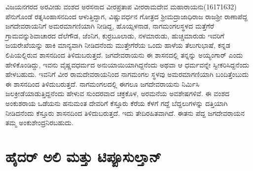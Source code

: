 ವಿಜಯನಗರದ ಅರವೀಡು ವಂಶದ ಅರಸನಾದ ವೀರಪ್ರತಾಪ ವೀರರಾಮದೇವ ಮಹಾರಾಯನು(1617\enginline{-}1632) ಪೆನುಗೊಂಡೆ ರತ್ನಸಿಂಹಾಸನದಿಂದ ಆಳುತ್ತಿದ್ದಾಗ, ವಿಷ್ಣುವರ್ಧನ ಗೋತ್ರದ ಶ‍್ರೀಮದ್ರಾಜಾಧಿರಾಜ ರಾಜಶ‍್ರೀ ರಾಣಾಪೆದ್ದ ಜಗದೇವರಾಯನಿಗೆ ಅಮರಮಾಗಣಿಯಾಗಿ ನೀಡಿದ್ದ, ಹೊಯ್ಸಳನಾಡ, ನಾಗಮಂಗಲಸ್ಥಳದ ಮತ್ತೆಗೆರೆ ಗ್ರಾಮವನ್ನು\break ಶಿವಾಚಾರದ ದೆಲೆಗೌಡ, ಜೆಂನಿಗ, ಕುರ್ರಬೂಲಾಡು, ನಳಮಾರುಡು, ಹುಚ್ಚಮಾರುಡು ಇವರಿಗೆ ಜಯರೇಖೆಯನ್ನು ಹಾಕಿ ಮಾನ್ಯವಾಗಿ ನೀಡಿದನೆಂದು ಮುತ್ತೇಗೆರೆಯ ಒಂದು ಹಾಳೆಯ ತೆಲುಗುಭಾಷೆ, ಕನ್ನಡ ಲಿಪಿಯಲ್ಲಿರುವ ಶಾಸನದಿಂದ ತಿಳಿದುಬರುತ್ತದೆ. ಜಗದೇವರಾಯನು ಈ ಶಾಸನದಲ್ಲಿ ತನ್ನನ್ನು ಅಯ್ಯಂಗಾರ್​ ಎಂದು ಹೇಳಿಕೊಂಡಿದ್ದು, ಇವನು ವೈಷ್ಣವಧರ್ಮದ ಅನುಯಾಯಿ\-ಯಾಗಿದ್ದನೆಂದು ಅಥವಾ ಆ ಧರ್ಮವನ್ನೇ ಸ್ವೀಕರಿಸಿದ್ದನೆಂದು ಹೇಳಬಹುದು. ಇವನಿಗೆ ವೀರ ರಾಮದೇವರಾಯನಿಂದ ನಾಗಮಂಗಲ ಸ್ಥಳವು ಅಮರಮಾಗಣಿಯಾಗಿ ಬಂದಿತ್ತೆಂಬುದು ಈ ಶಾಸನದಿಂದ ತಿಳಿದುಬರುತ್ತದೆ. ನಾಗಮಂಗಲದಲ್ಲಿ ಈಗಲೂ ಜಗದೇವರಾಯನು ನಿರ್ಮಿಸಿ ಜಲಕ್ರೀಡೆಯಾಡುತ್ತಿದ್ದನೆಂದು ಹೇಳುವ ಸುಂದರವಾದ ಚಕ್ರಕೊಳ, ಅರಮನೆಯ ಅವಶೇಷಗಳಿವೆ. ಈ ವಂಶದ ಅಂಕುಶರಾಯ ಒಡೆಯನು ಹನುಮಂತ ದೇವರಿಗೆ ಕೆಸ್ತೂರು ಕೆರೆಯ ಕೆಳಗೆ ಗದ್ದೆ ಬೆದ್ದಲುಗಳನ್ನು ದತ್ತಿಯಾಗಿ ನೀಡಿದನೆಂದು ಕೆಸ್ತೂರು ಶಾಸನದಿಂದ ತಿಳಿದುಬರುತ್ತದೆ. ಇದು ತೇದಿರಹಿತವಾಗಿದೆ. ಈತನು ಪೆದ್ದ ಜಗದೇವರಾಯನ ತಮ್ಮ ಅಂಕುಶೇಂದ್ರನಿರಬಹುದು.


\section{ಹೈದರ್​ ಅಲಿ ಮತ್ತು ಟಿಪ್ಪೂಸುಲ್ತಾನ್​}

